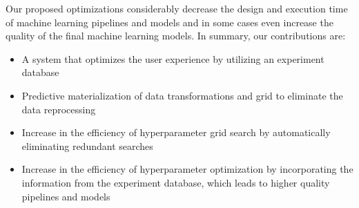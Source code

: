 Our proposed optimizations considerably decrease the design and execution time of machine learning pipelines and models and in some cases even increase the quality of the final machine learning models.
In summary, our contributions are:
\begin{itemize}
\item A system that optimizes the user experience by utilizing an experiment database
\item Predictive materialization of data transformations and grid to eliminate the data reprocessing
\item Increase in the efficiency of hyperparameter grid search by automatically eliminating redundant searches
\item Increase in the efficiency of hyperparameter optimization by incorporating the information from the experiment database, which leads to higher quality pipelines and models
\end{itemize}